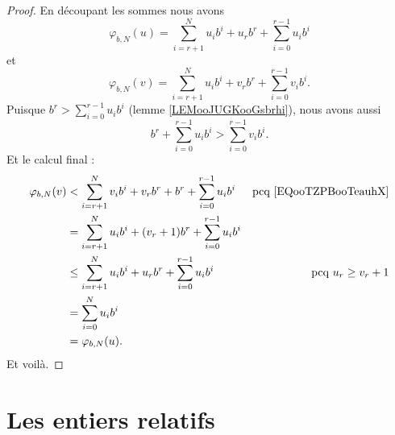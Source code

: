 \begin{proof}
	En découpant les sommes nous avons
	\begin{equation}
		\varphi_{b,N}(u)=\sum_{i=r+1}^Nu_ib^i+u_rb^r+\sum_{i=0}^{r-1}u_ib^i
	\end{equation}
	et
	\begin{equation}
		\varphi_{b,N}(v)=\sum_{i=r+1}^Nu_ib^i+v_rb^r+\sum_{i=0}^{r-1}v_ib^i.
	\end{equation}
	Puisque \( b^r>\sum_{i=0}^{r-1}u_ib^i\) (lemme \ref{LEMooJUGKooGsbrhi}), nous avons aussi
	\begin{equation}        \label{EQooTZPBooTeauhX}
		b^r+\sum_{i=0}^{r-1}u_ib^i>\sum_{i=0}^{r-1}v_ib^i.
	\end{equation}
	Et le calcul final :
	\begin{subequations}
		\begin{align}
			\varphi_{b,N}(v) & <   \sum_{i=r+1}^Nv_ib^i+v_rb^r+b^r+\sum_{i=0}^{r-1}u_ib^i & \text{pcq \eqref{EQooTZPBooTeauhX}} \\
			                 & =   \sum_{i=r+1}^Nu_ib^i+(v_r+1)b^r+\sum_{i=0}^{r-1}u_ib^i                                       \\
			                 & \leq  \sum_{i=r+1}^Nu_ib^i+u_rb^r+\sum_{i=0}^{r-1}u_ib^i   & \text{pcq } u_r\geq v_r+1           \\
			                 & =   \sum_{i=0}^Nu_ib^i                                                                           \\
			                 & =   \varphi_{b,N}(u).
		\end{align}
	\end{subequations}
	Et voilà.
\end{proof}


\section{Les entiers relatifs}
\label{SECooNombresEntiers}

